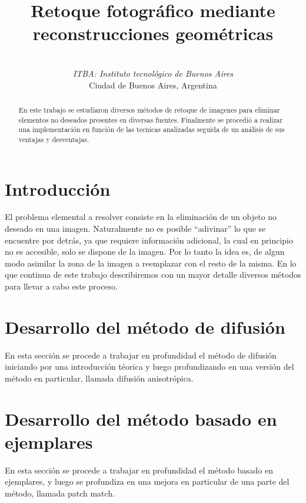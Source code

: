 \documentclass[conference]{IEEEtran}
\begin{document}
\title{Retoque fotográfico mediante reconstrucciones geométricas}
\author{
 \\
\textit{ITBA: Instituto tecnológico de Buenos Aires}\\
Ciudad de Buenos Aires, Argentina
}
\maketitle

\begin{abstract}
En este trabajo se estudiaron diversos métodos de retoque de imagenes para eliminar elementos no deseados presentes en diversas fuentes. Finalmente se procedió a realizar una implementación en función de las tecnicas analizadas seguida de un análisis de sus ventajas y desventajas.
\end{abstract}

\section{Introducción}
El problema elemental a resolver consiste en la eliminación de un objeto no deseado en una imagen.
Naturalmente no es posible ``adivinar'' lo que se encuentre por detrás, ya que requiere información adicional, la cual en principio no es accesible, solo se dispone de la imagen. Por lo tanto la idea es, de algun modo asimilar la zona de la imagen a reemplazar con el resto de la misma. En lo que continua de este trabajo describiremos con un mayor detalle diversos métodos para llevar a cabo este proceso.



\section{Desarrollo del método de difusión}
En esta sección se procede a trabajar en profundidad el método de difusión iniciando por una introducción téorica y luego profundizando en una versión del método en particular, llamada difusión anisotrópica.




\section{Desarrollo del método basado en ejemplares}
En esta sección se procede a trabajar en profundidad el método basado en ejemplares, y luego se profundiza en una mejora en particular de una parte del método, llamada patch match.
\end{document}
